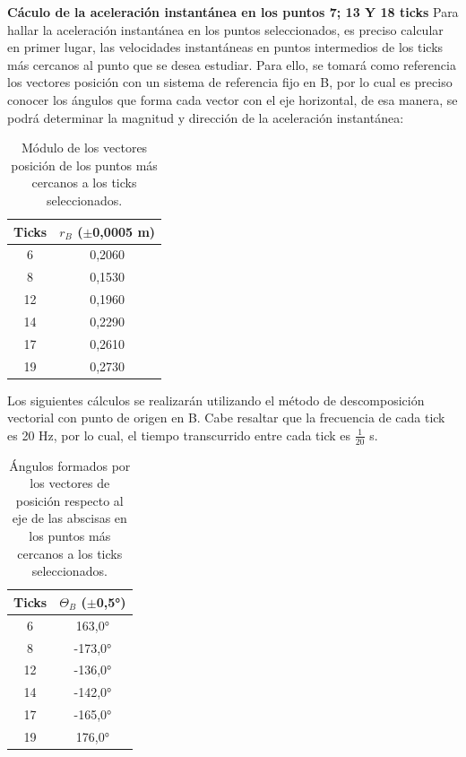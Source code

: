 \documentclass[../main.tex]{subfiles}
\begin{document}
\textbf{Cáculo de la aceleración instantánea en los puntos 7; 13 Y 18 ticks}
Para hallar la aceleración instantánea en los puntos seleccionados, es preciso
calcular en primer lugar, las velocidades instantáneas en puntos intermedios de
los ticks más cercanos al punto que se desea estudiar. Para ello, se tomará como 
referencia los vectores posición con un sistema de referencia fijo en B,
 por lo cual es preciso conocer los ángulos que forma cada vector con el 
 eje horizontal, de esa manera, se podrá determinar la magnitud y dirección
  de la aceleración instantánea:

\begin{table}[H]
    \centering
    \begin{tabular}{c|c}
        \hline
        Ticks &	$r_B$ ($\pm$0,0005 m) \\
        \hline
        6	& 0,2060\\
        8	& 0,1530\\
        12	& 0,1960\\
        14	& 0,2290\\
        17	& 0,2610\\
        19	& 0,2730\\
        \hline
    \end{tabular}
    \label{ref:tab7}
    \caption{Módulo de los vectores posición de los puntos más cercanos a los ticks seleccionados.}
\end{table}

Los siguientes cálculos se realizarán utilizando el método de descomposición vectorial con punto de origen en B. Cabe resaltar que la frecuencia de cada tick es 20 Hz, por lo cual,
el tiempo transcurrido entre cada tick es $\frac{1}{20}$ s.

\begin{table}[H]
    \centering
    \begin{tabular}{c|c}
        \hline
        Ticks	& $\Theta_B$  ($\pm$0,5°) \\
        \hline 
        6 & 	163,0°\\
        8	 & -173,0°\\
        12	 & -136,0°\\
        14	 & -142,0°\\
        17	 & -165,0°\\
        19 & 	176,0°\\
        \hline
    \end{tabular}
    \label{ref:tab8}
    \caption{Ángulos formados por los vectores de posición respecto al eje de las abscisas en los puntos más cercanos a los ticks seleccionados.}
\end{table}
\end{document}
